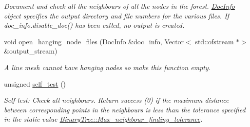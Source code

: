 \begin{DoxyCompactItemize}
\begin{DoxyCompactList}\small\item\em Document and check all the neighbours of all the nodes in the forest. \hyperlink{classoomph_1_1DocInfo}{Doc\+Info} object specifies the output directory and file numbers for the various files. If {\ttfamily doc\+\_\+info.\+disable\+\_\+doc()} has been called, no output is created. \end{DoxyCompactList}\item 
void \hyperlink{classoomph_1_1BinaryTreeForest_a3567e04e401c5abc64dff4280e93d592}{open\+\_\+hanging\+\_\+node\+\_\+files} (\hyperlink{classoomph_1_1DocInfo}{Doc\+Info} \&doc\+\_\+info, \hyperlink{classoomph_1_1Vector}{Vector}$<$ std\+::ofstream $\ast$$>$ \&output\+\_\+stream)
\begin{DoxyCompactList}\small\item\em A line mesh cannot have hanging nodes so make this function empty. \end{DoxyCompactList}\item 
unsigned \hyperlink{classoomph_1_1BinaryTreeForest_a7cf3ec0bdb4c0955ca35bcc2e0874f80}{self\+\_\+test} ()
\begin{DoxyCompactList}\small\item\em Self-\/test\+: Check all neighbours. Return success (0) if the maximum distance between corresponding points in the neighbours is less than the tolerance specified in the static value \hyperlink{classoomph_1_1Tree_aef9abebc166fa3bf81ecb59ec0d5d6b2}{Binary\+Tree\+::\+Max\+\_\+neighbour\+\_\+finding\+\_\+tolerance}. \end{DoxyCompactList}\end{DoxyCompactItemize}
